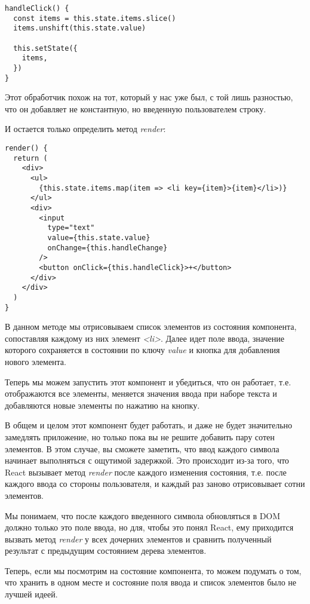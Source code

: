 \begin{lstlisting}
handleClick() {
  const items = this.state.items.slice()
  items.unshift(this.state.value)
  
  this.setState({
    items,
  })
}
\end{lstlisting}

Этот обработчик похож на тот, который у нас уже был, с той лишь разностью, что он добавляет не константную, но введенную пользователем строку.

И остается только определить метод \textit{render}:

\begin{lstlisting}
render() {
  return (
    <div>
      <ul>
        {this.state.items.map(item => <li key={item}>{item}</li>)}
      </ul>
      <div>
        <input
          type="text"
          value={this.state.value}
          onChange={this.handleChange}
        />
        <button onClick={this.handleClick}>+</button>
      </div>
    </div>
  )
}
\end{lstlisting}

В данном методе мы отрисовываем список элементов из состояния компонента, сопоставляя каждому из них элемент \textit{<li>}. Далее идет поле ввода, значение которого сохраняется в состоянии по ключу \textit{value} и кнопка для добавления нового элемента.

Теперь мы можем запустить этот компонент и убедиться, что он работает, т.е. отображаются все элементы, меняется значения ввода при наборе текста и добавляются новые элементы по нажатию на кнопку.

В общем и целом этот компонент будет работать, и даже не будет значительно замедлять приложение, но только пока вы не решите добавить пару сотен элементов. В этом случае, вы сможете заметить, что ввод каждого символа начинает выполняться с ощутимой задержкой. Это происходит из-за того, что React вызывает метод \textit{render} после каждого изменения состояния, т.е. после каждого ввода со стороны пользователя, и каждый раз заново отрисовывает сотни элементов.

Мы понимаем, что после каждого введенного символа обновляться в DOM должно только это поле ввода, но для, чтобы это понял React, ему приходится вызвать метод \textit{render} у всех дочерних элементов и сравнить полученный результат с предыдущим состоянием дерева элементов.

Теперь, если мы посмотрим на состояние компонента, то можем подумать о том, что хранить в одном месте и состояние поля ввода и список элементов было не лучшей идеей.

